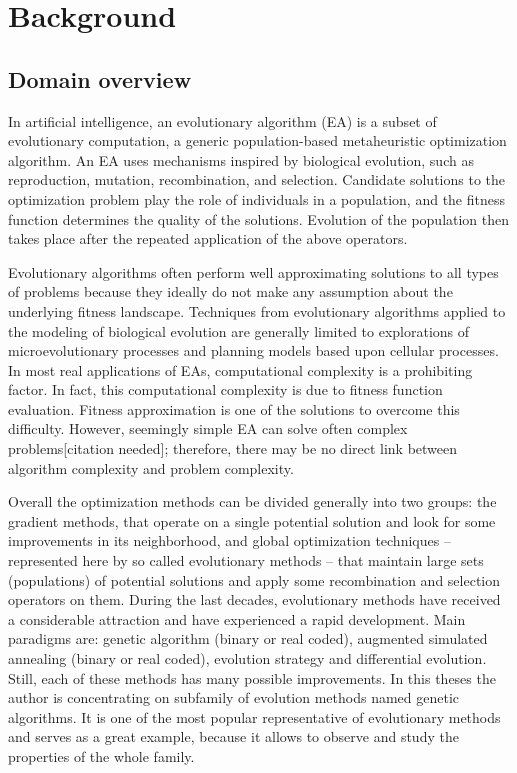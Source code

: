 \chapter{Background}

\section{Domain overview}

In artificial intelligence, an evolutionary algorithm (EA) is a subset of evolutionary computation, a generic population-based metaheuristic optimization algorithm. An EA uses mechanisms inspired by biological evolution, such as reproduction, mutation, recombination, and selection. Candidate solutions to the optimization problem play the role of individuals in a population, and the fitness function determines the quality of the solutions. Evolution of the population then takes place after the repeated application of the above operators.

Evolutionary algorithms often perform well approximating solutions to all types of problems because they ideally do not make any assumption about the underlying fitness landscape. Techniques from evolutionary algorithms applied to the modeling of biological evolution are generally limited to explorations of microevolutionary processes and planning models based upon cellular processes. In most real applications of EAs, computational complexity is a prohibiting factor. In fact, this computational complexity is due to fitness function evaluation. Fitness approximation is one of the solutions to overcome this difficulty. However, seemingly simple EA can solve often complex problems[citation needed]; therefore, there may be no direct link between algorithm complexity and problem complexity.

Overall the optimization methods can be divided generally into two groups: the gradient methods, that operate on a single potential solution and look for some improvements in its neighborhood, and global optimization techniques – represented here by so called evolutionary methods – that maintain large sets (populations) of potential solutions and apply some recombination and selection operators on them. During the last decades, evolutionary methods have received a considerable attraction and have experienced a rapid development. Main paradigms are: genetic algorithm (binary or real coded), augmented simulated annealing (binary or real coded), evolution strategy and differential evolution. Still, each of these methods has many possible improvements.
In this theses the author is concentrating on subfamily of evolution methods named genetic algorithms. It is one of the most popular representative of evolutionary methods and serves as a great example, because it allows to observe and study the properties of the whole family.

